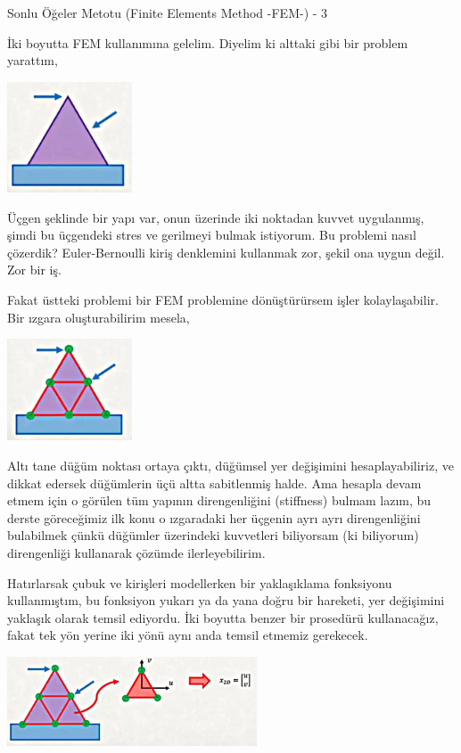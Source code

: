 \documentclass[12pt,fleqn]{article}\usepackage{../../common}
\begin{document}
Sonlu Öğeler Metotu (Finite Elements Method -FEM-) - 3

İki boyutta FEM kullanımına gelelim. Diyelim ki alttaki gibi bir problem
yarattım,

\includegraphics[width=10em]{compscieng_bpp45fem3_01.jpg}

Üçgen şeklinde bir yapı var, onun üzerinde iki noktadan kuvvet uygulanmış, şimdi
bu üçgendeki stres ve gerilmeyi bulmak istiyorum. Bu problemi nasıl çözerdik?
Euler-Bernoulli kiriş denklemini kullanmak zor, şekil ona uygun değil. Zor bir
iş.

Fakat üstteki problemi bir FEM problemine dönüştürürsem işler
kolaylaşabilir. Bir ızgara oluşturabilirim mesela,

\includegraphics[width=10em]{compscieng_bpp45fem3_02.jpg}

Altı tane düğüm noktası ortaya çıktı, düğümsel yer değişimini hesaplayabiliriz,
ve dikkat edersek düğümlerin üçü altta sabitlenmiş halde. Ama hesapla devam
etmem için o görülen tüm yapının direngenliğini (stiffness) bulmam lazım, bu
derste göreceğimiz ilk konu o ızgaradaki her üçgenin ayrı ayrı direngenliğini
bulabilmek çünkü düğümler üzerindeki kuvvetleri biliyorsam (ki biliyorum)
direngenliği kullanarak çözümde ilerleyebilirim.

Hatırlarsak çubuk ve kirişleri modellerken bir yaklaşıklama fonksiyonu
kullanmıştım, bu fonksiyon yukarı ya da yana doğru bir hareketi, yer değişimini
yaklaşık olarak temsil ediyordu. İki boyutta benzer bir prosedürü kullanacağız,
fakat tek yön yerine iki yönü aynı anda temsil etmemiz gerekecek.

\includegraphics[width=20em]{compscieng_bpp45fem3_03.jpg}
\end{document}
